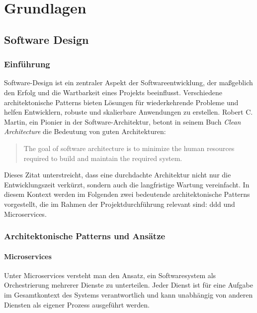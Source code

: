 \chapter{Grundlagen}

\section{Software Design}

\subsection{Einführung}

Software-Design ist ein zentraler Aspekt der Softwareentwicklung, der maßgeblich den Erfolg und die Wartbarkeit eines Projekts beeinflusst. Verschiedene architektonische Patterns bieten Lösungen für wiederkehrende Probleme und helfen Entwicklern, robuste und skalierbare Anwendungen zu erstellen. Robert C. Martin, ein Pionier in der Software-Architektur, betont in seinem Buch \textit{Clean Architecture} die Bedeutung von guten Architekturen:

\begin{quote}
The goal of software architecture is to minimize the human resources required to build and maintain the required system. \autocite{martin:clean-architecture}
\end{quote}

Dieses Zitat unterstreicht, dass eine durchdachte Architektur nicht nur die Entwicklungszeit verkürzt, sondern auch die langfristige Wartung vereinfacht. In diesem Kontext werden im Folgenden zwei bedeutende architektonische Patterns vorgestellt, die im Rahmen der Projektdurchführung relevant sind: \ac{ddd} und Microservices.

\subsection{Architektonische Patterns und Ansätze}

\subsubsection{Microservices} \label{cha:grundlagen:swdesign:microservices}

Unter Microservices versteht man den Ansatz, ein Softwaresystem als Orchestrierung mehrerer Dienste zu unterteilen. Jeder Dienst ist für eine Aufgabe im Gesamtkontext des Systems verantwortlich und kann unabhängig von anderen Diensten als eigener Prozess ausgeführt werden. \autocite{LewisFowler2024}

